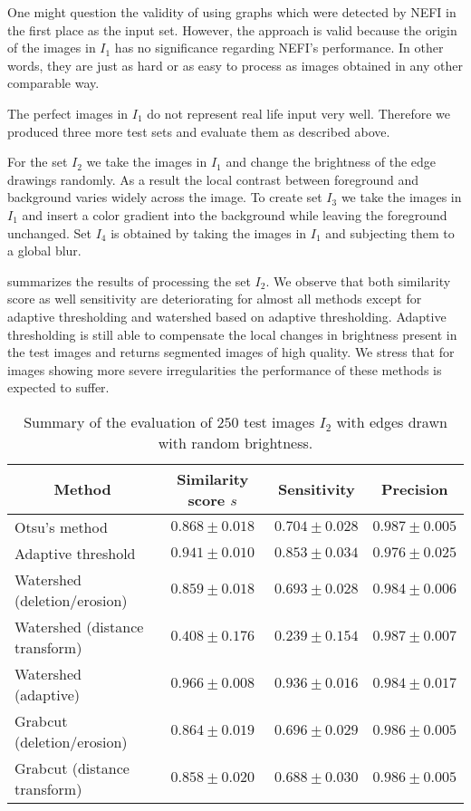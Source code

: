 
		One might question the validity of using graphs which were detected by NEFI in the first place as the input set. However, the approach is valid because the origin of the images in $I_1$ has no significance regarding NEFI's performance. In other words, they are just as hard or as easy to process as images obtained in any other comparable way. 

		The perfect images in $I_1$ do not represent real life input very well. Therefore we produced three more test sets and evaluate them as described above.

		For the set $I_2$ we take the images in $I_1$ and change the brightness of the edge drawings randomly. As a result the local contrast between foreground and background varies widely across the image. To create set $I_3$ we take the images in $I_1$ and insert a color gradient into the background while leaving the foreground unchanged. Set $I_4$ is obtained by taking the images in $I_1$ and subjecting them to a global blur.

		 summarizes the results of processing the set $I_2$. We observe that both similarity score as well sensitivity are deteriorating for almost all methods except for adaptive thresholding and watershed based on adaptive thresholding. Adaptive thresholding is still able to compensate the local changes in brightness present in the test images and returns segmented images of high quality. We stress that for images showing more severe irregularities the performance of these methods is expected to suffer. 

		\begin{table}
			\centering
			\begin{tabular}{@{} l *3c @{}}
			\toprule
			\multicolumn{1}{c}{Method}    & Similarity score $s$  & Sensitivity  & Precision \\ 
			\midrule
			Otsu's method                   & $0.868 \pm 0.018$ & $0.704 \pm 0.028$ & $0.987 \pm 0.005$ \\
			Adaptive threshold              & $0.941 \pm 0.010$ & $0.853 \pm 0.034$ & $0.976 \pm 0.025$ \\
			Watershed (deletion/erosion)    & $0.859 \pm 0.018$ & $0.693 \pm 0.028$ & $0.984 \pm 0.006$ \\
			Watershed (distance transform)  & $0.408 \pm 0.176$ & $0.239 \pm 0.154$ & $0.987 \pm 0.007$ \\
			Watershed (adaptive)            & $0.966 \pm 0.008$ & $0.936 \pm 0.016$ & $0.984 \pm 0.017$ \\
			Grabcut (deletion/erosion)      & $0.864 \pm 0.019$ & $0.696 \pm 0.029$ & $0.986 \pm 0.005$ \\
			Grabcut (distance transform)    & $0.858 \pm 0.020$ & $0.688 \pm 0.030$ & $0.986 \pm 0.005$ \\
			\bottomrule
			\end{tabular}
			\caption[NEFI's evaluation: Edges with varying brigthness]{Summary of the evaluation of $250$ test images $I_2$ with edges drawn with random brightness.}
			\label{tab:colored_edges}
		\end{table}

